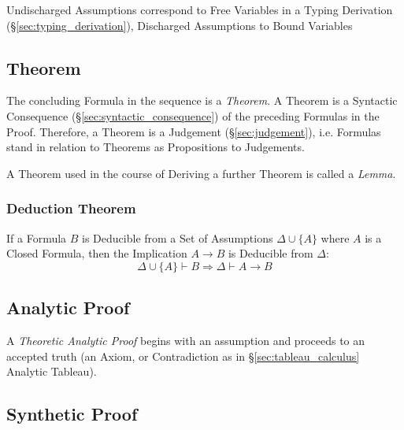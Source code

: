 Undischarged Assumptions correspond to Free Variables in a Typing
Derivation (\S\ref{sec:typing_derivation}), Discharged Assumptions to
Bound Variables


\subsection{Theorem}\label{sec:theorem}

The concluding Formula in the sequence is a \emph{Theorem}. A Theorem
is a Syntactic Consequence (\S\ref{sec:syntactic_consequence}) of the
preceding Formulas in the Proof. Therefore, a Theorem is a Judgement
(\S\ref{sec:judgement}), i.e. Formulas stand in relation to Theorems
as Propositions to Judgements. \cite{martinlof84}

A Theorem used in the course of Deriving a further Theorem is called a
\emph{Lemma}.



\subsubsection{Deduction Theorem}\label{sec:deduction_theorem}

If a Formula $B$ is Deducible from a Set of Assumptions $\Delta \cup
\{ A \}$ where $A$ is a Closed Formula, then the Implication $A
\rightarrow B$ is Deducible from $\Delta$:
\[
  \Delta \cup \{A\} \vdash B \Rightarrow \Delta \vdash A \rightarrow B
\]



\subsection{Analytic Proof}\label{sec:analytic_proof}

A \emph{Theoretic Analytic Proof} begins with an assumption and
proceeds to an accepted truth (an Axiom, or Contradiction as in
\S\ref{sec:tableau_calculus} Analytic Tableau).



\subsection{Synthetic Proof}\label{sec:synthetic_proof}

